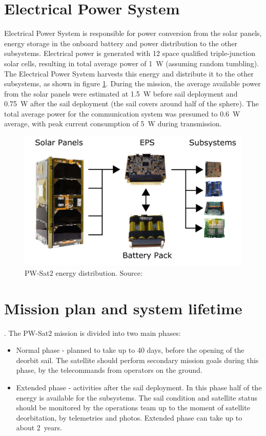 \section{Electrical Power System}
Electrical Power System is responsible for power conversion from the solar panels, energy storage in the onboard battery and power distribution to the other subsystems. Electrical power is generated with \si{12} space qualified triple-junction solar cells, resulting in total average power of \SI{1}{\watt} (assuming random tumbling). The Electrical Power System harvests this energy and distribute it to the other subsystems, as shown in figure \ref{pwsat_eps_distribution}. During the mission, the average available power from the solar panels were estimated at \SI{1.5}{\watt} before sail deployment and \SI{0.75}{\watt} after the sail deployment (the sail covers around half of the sphere). The total average power for the communication system was presumed to \SI{0.6}{\watt} average, with peak current consumption of \SI{5}{\watt} during transmission.
\begin{figure}
    \centering
    \includegraphics[width=0.7\paperwidth]{img/3/pwsat_eps_distribution.png}
    \caption{PW-Sat2 energy distribution. Source: \cite{PW_sat2_photo}}
    \label{pwsat_eps_distribution}
\end{figure}

\section{Mission plan and system lifetime}
\label{sect:mission_phases}.
The PW-Sat2 mission is divided into two main phases:
\begin{itemize}
    \item Normal phase - planned to take up to 40 days, before the opening of the deorbit sail. The satellite should perform secondary mission goals during this phase, by the telecommands from operators on the ground. 
    \item Extended phase - activities after the sail deployment. In this phase half of the energy is available for the subsystems. The sail condition and satellite status should be monitored by the operations team up to the moment of satellite deorbitation, by telemetries and photos. Extended phase can take up to about \si{2}~years.
\end{itemize}
